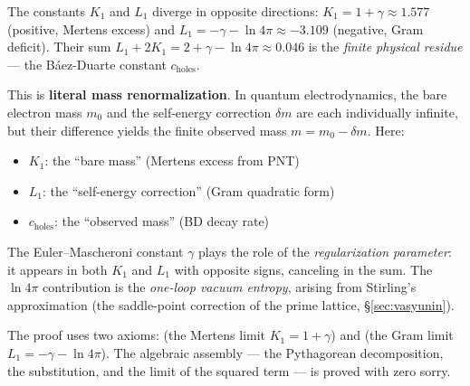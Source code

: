 \documentclass[11pt,a4paper]{article}
\begin{document}
\begin{principle}
The constants $K_1$ and $L_1$ diverge in opposite directions:
$K_1 = 1 + \gamma \approx 1.577$ (positive, Mertens excess) and
$L_1 = -\gamma - \ln 4\pi \approx -3.109$ (negative, Gram deficit).
Their sum $L_1 + 2K_1 = 2 + \gamma - \ln 4\pi \approx 0.046$ is the
\emph{finite physical residue} --- the B\'aez-Duarte constant
$c_{\mathrm{holes}}$.

This is \textbf{literal mass renormalization}. In quantum electrodynamics,
the bare electron mass $m_0$ and the self-energy correction $\delta m$
are each individually infinite, but their difference yields the finite
observed mass $m = m_0 - \delta m$. Here:
\begin{itemize}
  \item $K_1$: the ``bare mass'' (Mertens excess from PNT)
  \item $L_1$: the ``self-energy correction'' (Gram quadratic form)
  \item $c_{\mathrm{holes}}$: the ``observed mass'' (BD decay rate)
\end{itemize}
The Euler--Mascheroni constant $\gamma$ plays the role of the
\emph{regularization parameter}: it appears in both $K_1$ and $L_1$
with opposite signs, canceling in the sum. The $\ln 4\pi$ contribution
is the \emph{one-loop vacuum entropy}, arising from Stirling's
approximation (the saddle-point correction of the prime lattice,
\S\ref{sec:vasyunin}).

The proof uses two axioms:
 (the Mertens limit $K_1 = 1 + \gamma$) and
 (the Gram limit $L_1 = -\gamma - \ln 4\pi$).
The algebraic assembly --- the Pythagorean decomposition, the
substitution, and the limit of the squared term --- is proved with
zero sorry.
\end{principle}
\end{document}
